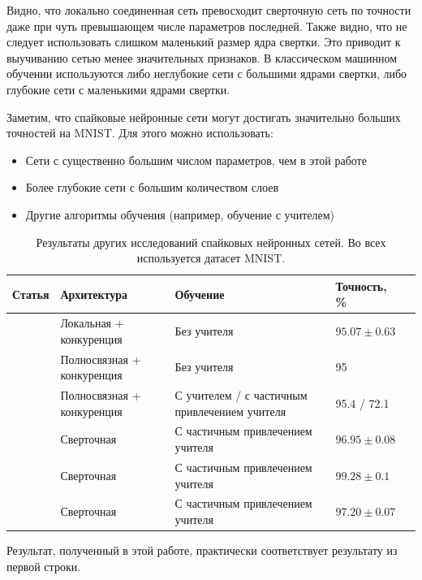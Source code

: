 \documentclass[a4paper]{article}
\begin{document}

Видно, что локально соединенная сеть превосходит сверточную сеть по точности даже при чуть превышающем числе параметров последней. Также видно, что не следует использовать слишком маленький размер ядра свертки. Это приводит к выучиванию сетью менее значительных признаков. В классическом машинном обучении используются либо неглубокие сети с большими ядрами свертки, либо глубокие сети с маленькими ядрами свертки.

Заметим, что спайковые нейронные сети могут достигать значительно больших точностей на MNIST. Для этого можно использовать:
\begin{itemize}
\item Сети с существенно большим числом параметров, чем в этой работе
\item Более глубокие сети с большим количеством слоев
\item Другие алгоритмы обучения (например, обучение с учителем)
\end{itemize}

\begin{table}[H]
 \caption{Результаты других исследований спайковых нейронных сетей. Во всех используется датасет MNIST.}
\begin{center}
\begin{tabular}{|l|p{4cm}|p{7cm}|l|l|}
\hline
Статья & Архитектура & Обучение & Точность, \% \\
\hline
{\cite{saunders2019locally}} & {Локальная + конкуренция} & {Без учителя} & {$95.07 \pm 0.63$}\\
\hline
{\cite{mnist1}} & {Полносвязная + конкуренция} & {Без учителя} & {95}\\
\hline
{\cite{MaxActiv1}} & {Полносвязная + конкуренция} & {С учителем / с частичным привлечением учителя} & {95.4 / 72.1}\\
\hline
{\cite{conv1}} & {Сверточная} & {С частичным привлечением учителя} & {$96.95 \pm 0.08$}\\
\hline
{\cite{conv2}} & {Сверточная} & {С частичным привлечением учителя} & {$99.28 \pm 0.1$}\\
\hline
{\cite{conv3}} & {Сверточная} & {С частичным привлечением учителя} & {$97.20 \pm 0.07$}\\
\hline
\end{tabular}
\end{center}
\end{table}

Результат, полученный в этой работе, практически соответствует результату из первой строки.
\end{document}
